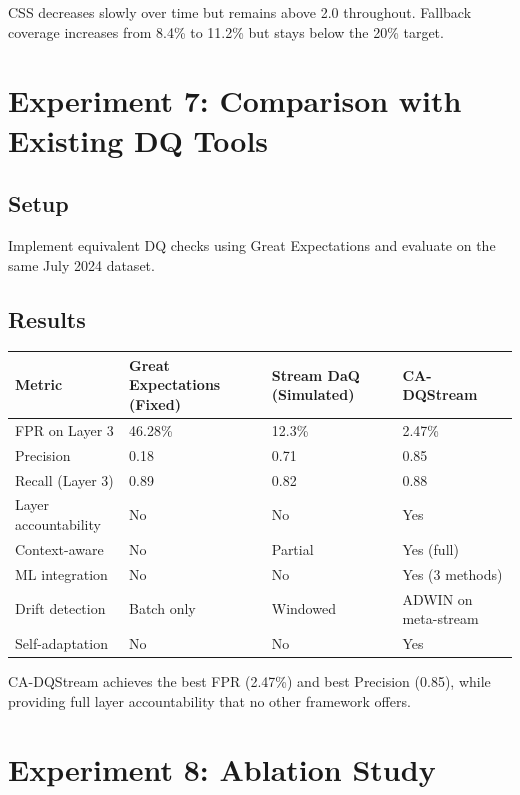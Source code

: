 CSS decreases slowly over time but remains above 2.0 throughout. Fallback coverage increases from 8.4\% to 11.2\% but stays below the 20\% target.

\section{Experiment 7: Comparison with Existing DQ Tools}

\subsection{Setup}

Implement equivalent DQ checks using Great Expectations and evaluate on the same July 2024 dataset.

\subsection{Results}

\begin{longtable}{|m{3.5cm}|m{4cm}|m{3cm}|m{3cm}|}
\hline
\textbf{Metric} & \textbf{Great Expectations (Fixed)} & \textbf{Stream DaQ (Simulated)} & \textbf{CA-DQStream} \\ \hline
FPR on Layer 3 & 46.28\% & 12.3\% & 2.47\% \\ \hline
Precision & 0.18 & 0.71 & 0.85 \\ \hline
Recall (Layer 3) & 0.89 & 0.82 & 0.88 \\ \hline
Layer accountability & No & No & Yes \\ \hline
Context-aware & No & Partial & Yes (full) \\ \hline
ML integration & No & No & Yes (3 methods) \\ \hline
Drift detection & Batch only & Windowed & ADWIN on meta-stream \\ \hline
Self-adaptation & No & No & Yes \\ \hline
\end{longtable}

CA-DQStream achieves the best FPR (2.47\%) and best Precision (0.85), while providing full layer accountability that no other framework offers.

\section{Experiment 8: Ablation Study}

